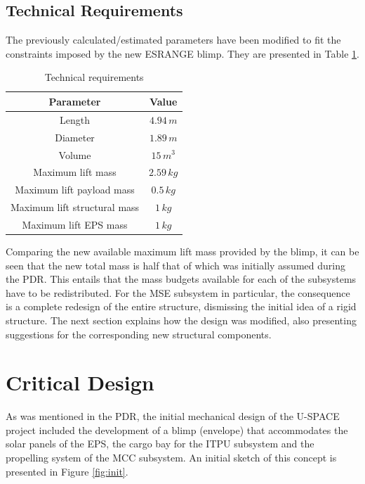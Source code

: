 \subsection{Technical Requirements}

The previously calculated/estimated parameters have been modified to fit the constraints imposed by the new ESRANGE blimp. They are presented in Table \ref{tab:technical}.

\begin{table}[H]
\centering
\caption{Technical requirements}
\label{tab:technical}
\begin{tabular}{c c}
\hline
\textbf{Parameter} & \textbf{Value}\\ \hline
Length & $4.94\,m$\\
Diameter & $1.89\,m$\\
Volume & $15\,m^3$\\
Maximum lift mass & $2.59\,kg$\\
Maximum lift payload mass & $0.5\,kg$\\
Maximum lift structural mass & $1\,kg$\\
Maximum lift \ac{EPS} mass  & $1\,kg$\\
\hline
\end{tabular}
\end{table}

\noindent
Comparing the new available maximum lift mass provided by the blimp, it can be seen that the new total mass is half that of which was initially assumed during the \ac{PDR}. This entails that the mass budgets available for each of the subsystems have to be redistributed. For the \ac{MSE} subsystem in particular, the consequence is a complete redesign of the entire structure, dismissing the initial idea of a rigid structure. The next section explains how the design was modified, also presenting suggestions for the corresponding new structural components.

\section{Critical Design}

As was mentioned in the \ac{PDR}, the initial mechanical design of the \ac{U-SPACE} project included the development of a blimp (envelope) that accommodates the solar panels of the \ac{EPS}, the cargo bay for the \ac{ITPU} subsystem and the propelling system of the \ac{MCC} subsystem. An initial sketch of this concept is presented in Figure \ref{fig:init}. 

